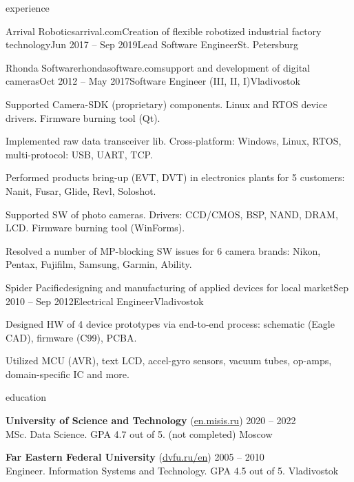 \documentclass{Vladimir.Ivanov.CV}
\begin{document}
\begin{rSection}{experience}
\begin{rCompany}{Arrival Robotics}{arrival.com}{Creation of flexible robotized industrial factory technology}{Jun 2017 -- Sep 2019}{Lead Software Engineer}{St. Petersburg}
\end{rCompany}
\begin{rCompany}{Rhonda Software}{rhondasoftware.com}{support and development of digital cameras}{Oct 2012 -- May 2017}{Software Engineer (III, II, I)}{Vladivostok}

\item Supported Camera-SDK (proprietary) components. Linux and RTOS device drivers. Firmware burning tool (Qt).
\item Implemented raw data transceiver lib. Cross-platform: Windows, Linux, RTOS, multi-protocol: USB, UART, TCP.
\item Performed products bring-up (EVT, DVT) in electronics plants for 5 customers: Nanit, Fusar, Glide, Revl, Soloshot.
\item Supported SW of photo cameras. Drivers: CCD/CMOS, BSP, NAND, DRAM, LCD. Firmware burning tool (WinForms).
\item Resolved a number of MP-blocking SW issues for 6 camera brands: Nikon, Pentax, Fujifilm, Samsung, Garmin, Ability.

\end{rCompany}
\begin{rCompany}{Spider Pacific}{}{designing and manufacturing of applied devices for local market}{Sep 2010 -- Sep 2012}{Electrical Engineer}{Vladivostok}

\item Designed HW of 4 device prototypes via end-to-end process: schematic (Eagle CAD), firmware (C99), PCBA.
\item Utilized MCU (AVR), text LCD, accel-gyro sensors, vacuum tubes, op-amps, domain-specific IC and more.

\end{rCompany}
\end{rSection}

\begin{rSection}{education}

{\bf University of Science and Technology } {(\href{https://en.misis.ru}{en.misis.ru})} \hfill {2020 -- 2022} \\
MSc. Data Science. GPA 4.7 out of 5. (not completed) \hfill {Moscow}

{\bf Far Eastern Federal University} {(\href{https://www.dvfu.ru/en}{dvfu.ru/en})} \hfill {2005 -- 2010} \\
Engineer. Information Systems and Technology. GPA 4.5 out of 5. \hfill {Vladivostok}

\end{rSection}
\end{document}
